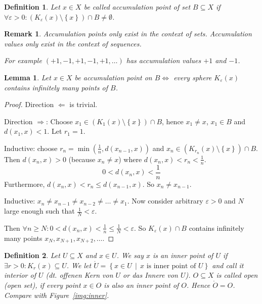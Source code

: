 \documentclass{article}
\newtheorem{definition}{Definition}  \numberwithin{definition}{section}
\newtheorem{lemma}{Lemma}  \numberwithin{lemma}{section}
\newtheorem{remark}{Remark}  \numberwithin{remark}{section}
\newcommand{\set}[1]{\left\{#1\right\}}
\newcommand{\setdef}[2]{\left\{\left.#1\,\middle|\,#2\right.\right\}}
\begin{document}
\begin{definition} %
  Let $x \in X$ be called accumulation point of set $B \subseteq X$ if $\forall \varepsilon > 0: (K_{\varepsilon}(x) \setminus \set{x}) \cap B \neq \emptyset$.
\end{definition}

\begin{remark}
  Accumulation \emph{points} only exist in the context of \emph{sets}.
  Accumulation \emph{values} only exist in the context of \emph{sequences}.

  For example $(+1, -1, +1, -1, +1, \dots)$ has accumulation \emph{values} $+1$ and $-1$.
\end{remark}

\begin{lemma}
  Let $x \in X$ be accumulation point on $B \iff$ every sphere $K_{\varepsilon}(x)$ contains infinitely many points of $B$.
\end{lemma}
\begin{proof}
  Direction $\Leftarrow$ is trivial.

  Direction $\Rightarrow$:
  Choose $x_1 \in (K_1(x) \setminus \set{x}) \cap B$, hence $x_1 \neq x$, $x_1 \in B$ and $d(x_1, x) < 1$.
  Let $r_1 = 1$.

  Inductive: choose $r_n = \min(\frac1n, d(x_{n-1}, x))$ and $x_n \in (K_{r_n}(x) \setminus \set{x}) \cap B$.
  Then $d(x_n, x) > 0$ (because $x_n \neq x$) where $d(x_n, x) < r_n < \frac1n$.
  \[ 0 < d(x_n, x) < \frac1n \]
  Furthermore, $d(x_n, x) < r_n \leq d(x_{n-1}, x)$.
  So $x_n \neq x_{n-1}$.

  Inductive: $x_n \neq x_{n-1} \neq x_{n-2} \neq \dots \neq x_1$.
  Now consider arbitrary $\varepsilon > 0$ and $N$ large enough such that $\frac1N < \varepsilon$.

  Then $\forall n \geq N: 0 < d(x_n, x) < \frac1n \leq \frac1N < \varepsilon$.
  So $K_{\varepsilon}(x) \cap B$ contains infinitely many points $x_N, x_{N+1}, x_{N+2}, \dots$.
\end{proof}

\begin{definition} %
  Let $U \subseteq X$ and $x \in U$.
  We say $x$ is an \emph{inner point of $U$} if $\exists r > 0: K_r(x) \subseteq U$.
  We let $\mathring{U} = \setdef{x \in U}{x \text{ is inner point of } U}$ and call it \emph{interior of $U$} (dt. \foreignlanguage{german}{offenen Kern von $U$} or \foreignlanguage{german}{das Innere von $U$}).
  $O \subseteq X$ is called \emph{open} (open set), if every point $x \in O$ is also an inner point of $O$.
  Hence $\mathring{O} = O$. Compare with Figure~\ref{img:inner}.
\end{definition}
\end{document}
